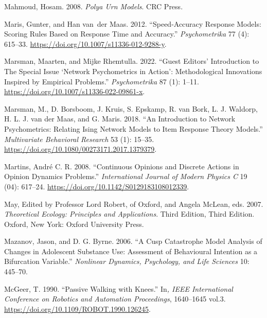 \documentclass[
  a4paper,
  DIV=11,
  numbers=noendperiod]{scrreprt}
\newlength{\cslhangindent}
\newlength{\cslentryspacingunit} %
\newenvironment{CSLReferences}[2] %
 {%
  \setlength{\parindent}{0pt}
  \ifodd #1
  \let\oldpar\par
  \def\par{\hangindent=\cslhangindent\oldpar}
  \fi
  \setlength{\parskip}{#2\cslentryspacingunit}
 }%
 {}
\begin{document}
\begin{CSLReferences}{1}{0}
\leavevmode{}%
Mahmoud, Hosam. 2008. \emph{Polya {Urn Models}}. {CRC Press}.

\leavevmode{}%
Maris, Gunter, and Han van~der Maas. 2012. {``Speed-Accuracy Response
Models: {Scoring} Rules Based on Response Time and Accuracy.''}
\emph{Psychometrika} 77 (4): 615--33.
\url{https://doi.org/10.1007/s11336-012-9288-y}.

\leavevmode{}%
Marsman, Maarten, and Mijke Rhemtulla. 2022. {``Guest {Editors}'
{Introduction} to {The Special Issue} {`{Network Psychometrics} in
{Action}'}: {Methodological Innovations Inspired} by {Empirical
Problems}.''} \emph{Psychometrika} 87 (1): 1--11.
\url{https://doi.org/10.1007/s11336-022-09861-x}.

\leavevmode{}%
Marsman, M., D. Borsboom, J. Kruis, S. Epskamp, R. van Bork, L. J.
Waldorp, H. L. J. van der Maas, and G. Maris. 2018. {``An Introduction
to Network Psychometrics: Relating Ising Network Models to Item Response
Theory Models.''} \emph{Multivariate Behavioral Research} 53 (1):
15--35. \url{https://doi.org/10.1080/00273171.2017.1379379}.

\leavevmode{}%
Martins, André C. R. 2008. {``Continuous Opinions and Discrete Actions
in Opinion Dynamics Problems.''} \emph{International Journal of Modern
Physics C} 19 (04): 617--24.
\url{https://doi.org/10.1142/S0129183108012339}.

\leavevmode{}%
May, Edited by Professor Lord Robert, of Oxford, and Angela McLean, eds.
2007. \emph{Theoretical {Ecology}: {Principles} and {Applications}}.
Third Edition, Third Edition. {Oxford, New York}: {Oxford University
Press}.

\leavevmode{}%
Mazanov, Jason, and D. G. Byrne. 2006. {``A {Cusp Catastrophe Model
Analysis} of {Changes} in {Adolescent Substance Use}: {Assessment} of
{Behavioural Intention} as a {Bifurcation Variable}.''} \emph{Nonlinear
Dynamics, Psychology, and Life Sciences} 10: 445--70.

\leavevmode{}%
McGeer, T. 1990. {``Passive Walking with Knees.''} In\emph{, {IEEE
International Conference} on {Robotics} and {Automation Proceedings}},
1640--1645 vol.3. \url{https://doi.org/10.1109/ROBOT.1990.126245}.


\end{CSLReferences}
\end{document}
